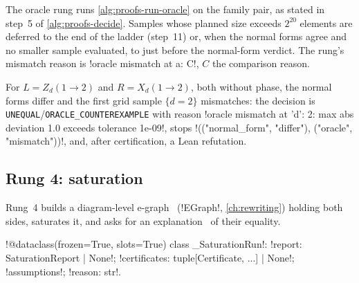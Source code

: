 The oracle rung runs \cref{alg:proofs-run-oracle} on the family pair, as stated in step~5 of \cref{alg:proofs-decide}. Samples whose planned size exceeds $2^{20}$ elements are deferred to the end of the ladder (step~11) or, when the normal forms agree and no smaller sample evaluated, to just before the normal-form verdict. The rung's mismatch reason is \code!oracle mismatch at {a}: C!, $C$ the comparison reason.

\begin{example}
For $L=Z_d(1\to2)$ and $R=X_d(1\to2)$, both without phase, the normal forms differ and the first grid sample $\{d=2\}$ mismatches: the decision is \texttt{UNEQUAL}/\allowbreak\texttt{ORACLE\_COUNTEREXAMPLE} with reason \code!oracle mismatch at {'d': 2}: max abs deviation 1.0 exceeds tolerance 1e-09!, stops \code!(("normal_form", "differ"), ("oracle", "mismatch"))!, and, after certification, a Lean refutation.
\end{example}

\subsection{Rung 4: saturation}\label{sec:proofs-rung-saturation}

Rung~4 builds a diagram-level e-graph~\cite{tate2011eqsat,willsey2021egg} (\py!EGraph!, \cref{ch:rewriting}) holding both sides, saturates it, and asks for an explanation~\cite{flatt2022proofs} of their equality.

\begin{signature}
\py!@dataclass(frozen=True, slots=True) class _SaturationRun!: \py!report: SaturationReport | None!; \py!certificates: tuple[Certificate, ...] | None!; \py!assumptions!; \py!reason: str!.
\end{signature}

